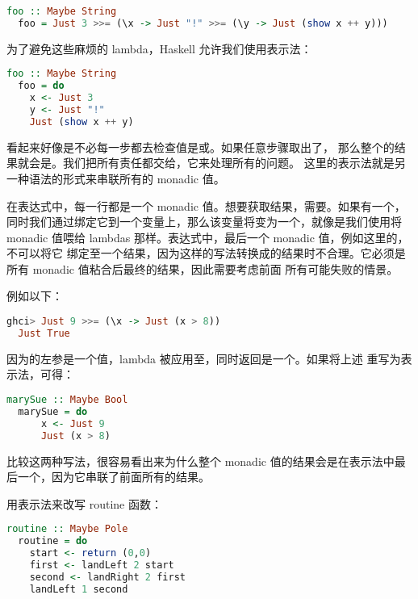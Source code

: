 \documentclass[./main.tex]{subfiles}
\begin{document}
\begin{lstlisting}[language=Haskell]
  foo :: Maybe String
  foo = Just 3 >>= (\x -> Just "!" >>= (\y -> Just (show x ++ y)))
\end{lstlisting}

为了避免这些麻烦的 lambda，Haskell 允许我们使用表示法：

\begin{lstlisting}[language=Haskell]
  foo :: Maybe String
  foo = do
    x <- Just 3
    y <- Just "!"
    Just (show x ++ y)
\end{lstlisting}

看起来好像是不必每一步都去检查值是或。如果任意步骤取出了，
那么整个的结果就会是。我们把所有责任都交给\acode{>>=}，它来处理所有的问题。
这里的表示法就是另一种语法的形式来串联所有的 monadic 值。

在表达式中，每一行都是一个 monadic 值。想要获取结果，需要\acode{<-}。如果有一个，
同时我们通过\acode{<-}绑定它到一个变量上，那么该变量将变为一个，就像是我们使用\acode{>>=}将 monadic
值喂给 lambdas 那样。表达式中，最后一个 monadic 值，例如这里的，不可以将它
绑定至一个结果，因为这样的写法转换成\acode{>>=}的结果时不合理。它必须是所有 monadic 值粘合后最终的结果，因此需要考虑前面
所有可能失败的情景。

例如以下：

\begin{lstlisting}[language=Haskell]
  ghci> Just 9 >>= (\x -> Just (x > 8))
  Just True
\end{lstlisting}

因为\acode{>>=}的左参是一个值，lambda 被应用至，同时返回是一个。如果将上述
重写为表示法，可得：

\begin{lstlisting}[language=Haskell]
  marySue :: Maybe Bool
  marySue = do
      x <- Just 9
      Just (x > 8)
\end{lstlisting}

比较这两种写法，很容易看出来为什么整个 monadic 值的结果会是在表示法中最后一个，因为它串联了前面所有的结果。

用表示法来改写 routine 函数：

\begin{lstlisting}[language=Haskell]
  routine :: Maybe Pole
  routine = do
    start <- return (0,0)
    first <- landLeft 2 start
    second <- landRight 2 first
    landLeft 1 second
\end{lstlisting}
\end{document}
